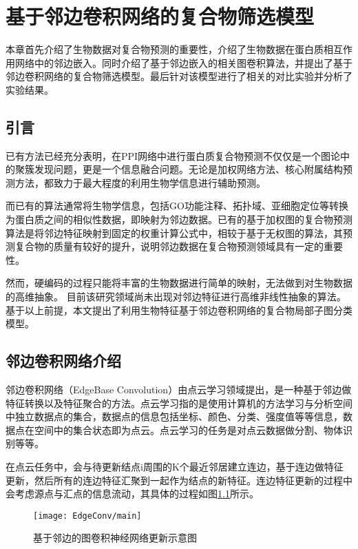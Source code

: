 \chapter{基于邻边卷积网络的复合物筛选模型}
\label{chapter:EdgeConv}

本章首先介绍了生物数据对复合物预测的重要性，介绍了生物数据在蛋白质相互作用网络中的邻边嵌入。同时介绍了基于邻边嵌入的相关图卷积算法，并提出了基于邻边卷积网络的复合物筛选模型。最后针对该模型进行了相关的对比实验并分析了实验结果。

\section{引言}
\label{section:EdgeConv:Put}

已有方法已经充分表明，在PPI网络中进行蛋白质复合物预测不仅仅是一个图论中的聚簇发现问题，更是一个信息融合问题。无论是加权网络方法、核心附属结构预测方法，都致力于最大程度的利用生物学信息进行辅助预测。

而已有的算法通常将生物学信息，包括GO功能注释、拓扑域、亚细胞定位等转换为蛋白质之间的相似性数据，即映射为邻边数据。已有的基于加权图的复合物预测算法是将邻边特征映射到固定的权重计算公式中，相较于基于无权图的算法，其预测复合物的质量有较好的提升，说明邻边数据在复合物预测领域具有一定的重要性。

然而，硬编码的过程只能将丰富的生物数据进行简单的映射，无法做到对生物数据的高维抽象。
目前该研究领域尚未出现对邻边特征进行高维非线性抽象的算法。
基于以上前提，本文提出了利用生物特征基于邻边卷积网络的复合物局部子图分类模型。

\section{邻边卷积网络介绍}
\label{section:EdgeConv:intro}

邻边卷积网络\cite{wang_dynamic_2019}（EdgeBase Convolution）由点云学习领域提出，是一种基于邻边做特征转换以及特征聚合的方法。点云学习指的是使用计算机的方法学习与分析空间中独立数据点的集合，数据点的信息包括坐标、颜色、分类、强度值等等信息，数据点在空间中的集合状态即为点云。点云学习的任务是对点云数据做分割、物体识别等等。

在点云任务中，会与待更新结点i周围的K个最近邻居建立连边，基于连边做特征更新，然后所有的连边特征汇聚到一起作为结点的新特征。连边特征更新的过程中会考虑源点与汇点的信息流动，其具体的过程如图\ref{fig:EdgeConv/main}所示。
\begin{figure}[htbp]
    \centering
    \texttt{[image: EdgeConv/main]}
    \caption{基于邻边的图卷积神经网络更新示意图\cite{wang_dynamic_2019}}
    \label{fig:EdgeConv/main}
\end{figure}

